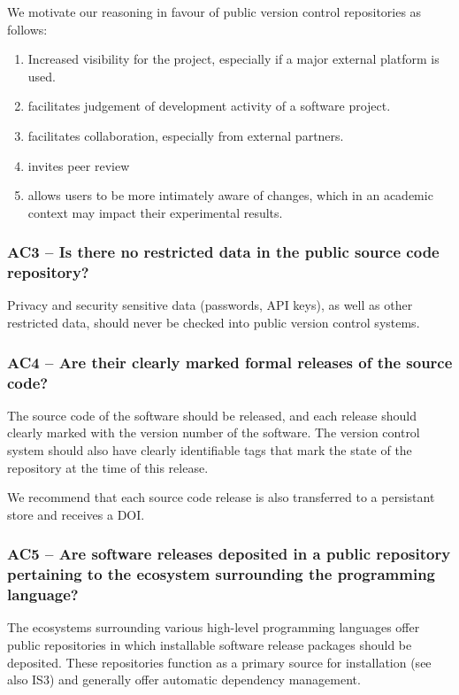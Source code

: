 \documentclass[a4paper,11pt]{article}
\begin{document}
We motivate our reasoning in favour of public version control repositories as follows:

\begin{enumerate}
    \item Increased visibility for the project, especially if a major external platform is used.
    \item facilitates judgement of development activity of a software project.
    \item facilitates collaboration, especially from external partners.
    \item invites peer review
    \item allows users to be more intimately aware of changes, which in an
        academic context may impact their experimental results.
\end{enumerate}

\subsubsection{AC3 -- Is there no restricted data in the public source code repository?}

Privacy and security sensitive data (passwords, API keys), as well as other
restricted data, should never be checked into public version control systems.

\subsubsection{AC4 -- Are their clearly marked formal releases of the source code?}

The source code of the software should be released, and each release should
clearly marked with the version number of the software. The version control
system should also have clearly identifiable tags that mark the state of the
repository at the time of this release.

We recommend that each source code release is also transferred to a persistant
store and receives a DOI.

\subsubsection{AC5 -- Are software releases deposited in a public
    repository pertaining to the ecosystem surrounding the programming
language?}

The ecosystems surrounding various high-level programming languages offer
public repositories in which installable software release packages should be
deposited. These repositories function as a primary source for installation (see also
IS3) and generally offer automatic dependency management.
\end{document}
